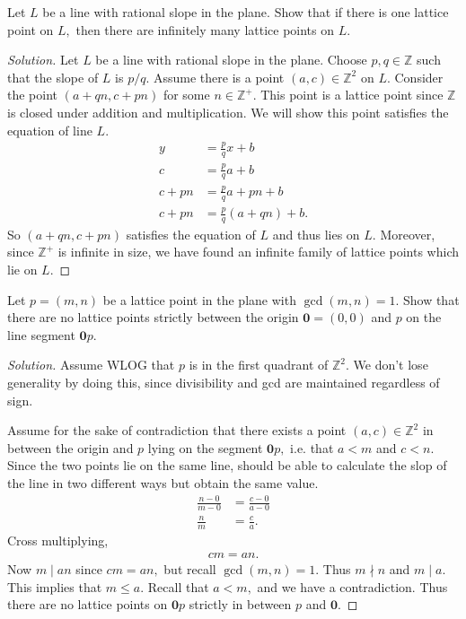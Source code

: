 \documentclass[12pt]{article}
\newcommand{\Z}{\mathbb{Z}}
\newenvironment{exercise}[2][Exercise]{\begin{trivlist}
        \item[\hskip \labelsep {\bfseries #1}\hskip \labelsep {\bfseries #2.}]}{\end{trivlist}}
\newenvironment{solution}
        {\begin{proof}[Solution]}
                    {\end{proof}}
\begin{document}
\begin{exercise}{24}
    Let \( L \) be a line with rational slope in the plane. Show that if there is one lattice point on \( L, \) then there are infinitely many lattice points on \( L. \)
    \begin{solution}
        Let \( L \) be a line with rational slope in the plane. Choose \( p,q \in \Z \) such that the slope of \( L \) is \( p/q. \) Assume there is a point \( (a,c) \in \Z^{2} \) on \( L. \) Consider the point \( ( a + qn, c + pn ) \) for some \( n \in \Z^{+} . \) This point is a lattice point since \( \Z \) is closed under addition and multiplication. We will show this point satisfies the equation of line \( L. \)
        \begin{align*}
            y &= \frac{p}{q} x + b\\[.5ex]
            c &= \frac{p}{q}a + b\\[.5ex]
            c + pn &= \frac{p}{q} a + pn + b\\[.5ex]
            c + pn &= \frac{p}{q} (a + qn) + b.
        \end{align*}
        So \( ( a+qn, c+pn ) \) satisfies the equation of \( L \) and thus lies on \( L. \) Moreover, since \( \Z^{+} \) is infinite in size, we have found an infinite family of lattice points which lie on \( L. \)
    \end{solution}
\end{exercise}

\begin{exercise}{25}
    Let \( p = ( m,n ) \) be a lattice point in the plane with \( \gcd(m,n) = 1. \) Show that there are no lattice points strictly between the origin \( \mathbf{0} = ( 0,0 ) \) and \( p \) on the line segment \( \mathbf{0}p. \)
    \begin{solution}
        Assume WLOG that \( p \) is in the first quadrant of \( \Z^{2} . \) We don't lose generality by doing this, since divisibility and gcd are maintained regardless of sign.
        
        Assume for the sake of contradiction that there exists a point \( ( a,c ) \in \Z^{2} \) in between the origin and \( p \) lying on the segment \( \mathbf{0}p, \) i.e. that \( a < m \) and \( c < n. \) Since the two points lie on the same line, should be able to calculate the slop of the line in two different ways but obtain the same value.
        \begin{align*}
            \frac{n - 0}{m - 0} &= \frac{c - 0}{a - 0}\\
            \frac{n}{m} &= \frac{c}{a} .
        \end{align*}
        Cross multiplying,
        \begin{align*}
            cm = an.
        \end{align*}
        Now \( m \mid an \) since \( cm = an, \) but recall \( \gcd(m,n) = 1. \) Thus \( m \nmid n \) and \( m \mid a. \) This implies that \( m \leq a. \) Recall that \( a < m, \) and we have a contradiction. Thus there are no lattice points on \( \mathbf{0}p \) strictly in between \( p \) and \( \mathbf{0} \).
    \end{solution}
\end{exercise}
\end{document}
